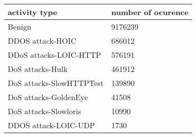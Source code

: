 \begin{tabular}{|p{6cm}|p{6cm}|}

\hline activity type & number of ocurence \\
\hline Benign & 9176239 \\
\hline DDOS attack-HOIC & 686012 \\
\hline DDoS attacks-LOIC-HTTP & 576191 \\
\hline DoS attacks-Hulk & 461912 \\
\hline DoS attacks-SlowHTTPTest & 139890 \\
\hline DoS attacks-GoldenEye & 41508 \\
\hline DoS attacks-Slowloris & 10990 \\
\hline DDOS attack-LOIC-UDP & 1730 \\
\hline

\end{tabular}
